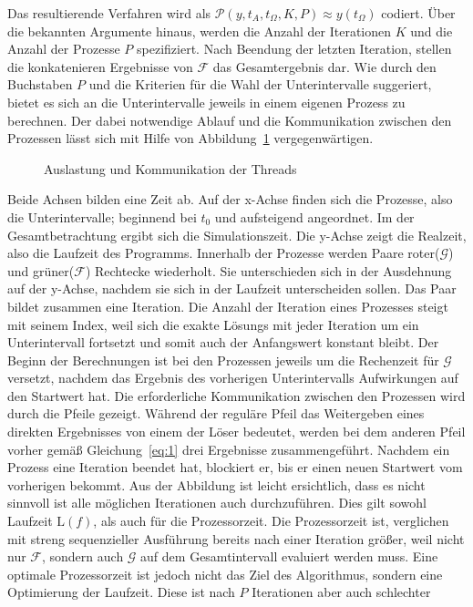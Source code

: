 Das resultierende Verfahren wird als \(\mathcal{P}\!\left(y, t_{A}, t_{\Omega},K,P\right) \approx y(t_\Omega)\) codiert. Über die bekannten Argumente hinaus, werden die Anzahl der Iterationen \(K\) und die Anzahl der Prozesse \(P\) spezifiziert. Nach Beendung der letzten Iteration, stellen die konkatenieren Ergebnisse von \(\mathcal{F}\) das Gesamtergebnis dar. Wie durch den Buchstaben \(P\) und die Kriterien für die Wahl der Unterintervalle suggeriert, bietet es sich an die Unterintervalle jeweils in einem eigenen Prozess zu berechnen. Der dabei notwendige Ablauf und die Kommunikation zwischen den Prozessen lässt sich mit Hilfe von Abbildung~\ref{fig:sequence} vergegenwärtigen.
\begin{figure}[ht]
    \centering
        
    \caption{Auslastung und Kommunikation der Threads}
    \label{fig:sequence}
\end{figure}
Beide Achsen bilden eine Zeit ab. Auf der x-Achse finden sich die Prozesse, also die Unterintervalle; beginnend bei \(t_0\) und aufsteigend angeordnet. Im der Gesamtbetrachtung ergibt sich die Simulationszeit. Die y-Achse zeigt die Realzeit, also die Laufzeit des Programms. Innerhalb der Prozesse werden Paare roter(\(\mathcal{G}\)) und grüner(\(\mathcal{F}\)) Rechtecke wiederholt. Sie unterschieden sich in der Ausdehnung auf der y-Achse, nachdem sie sich in der Laufzeit unterscheiden sollen. Das Paar bildet zusammen eine Iteration. Die Anzahl der Iteration eines Prozesses steigt mit seinem Index, weil sich die exakte Lösungs mit jeder Iteration um ein Unterintervall fortsetzt und somit auch der Anfangswert konstant bleibt. Der Beginn der Berechnungen ist bei den Prozessen jeweils um die Rechenzeit für \(\mathcal{G}\) versetzt, nachdem das Ergebnis des vorherigen Unterintervalls Aufwirkungen auf den Startwert hat. Die erforderliche Kommunikation zwischen den Prozessen wird durch die Pfeile gezeigt. Während der reguläre Pfeil das Weitergeben eines direkten Ergebnisses von einem der Löser bedeutet, werden bei dem anderen Pfeil vorher gemäß Gleichung~\ref{eq:1} drei Ergebnisse zusammengeführt. Nachdem ein Prozess eine Iteration beendet hat, blockiert er, bis er einen neuen Startwert vom vorherigen bekommt. Aus der Abbildung ist leicht ersichtlich, dass es nicht sinnvoll ist alle möglichen Iterationen auch durchzuführen. Dies gilt sowohl Laufzeit \(\mathrm{L}(f)\), als auch für die Prozessorzeit. Die Prozessorzeit ist, verglichen mit streng sequenzieller Ausführung bereits nach einer Iteration größer, weil nicht nur \(\mathcal{F}\), sondern auch \(\mathcal{G}\) auf dem Gesamtintervall evaluiert werden muss. Eine optimale Prozessorzeit ist jedoch nicht das Ziel des Algorithmus, sondern eine Optimierung der Laufzeit. Diese ist nach \(P\) Iterationen aber auch schlechter
